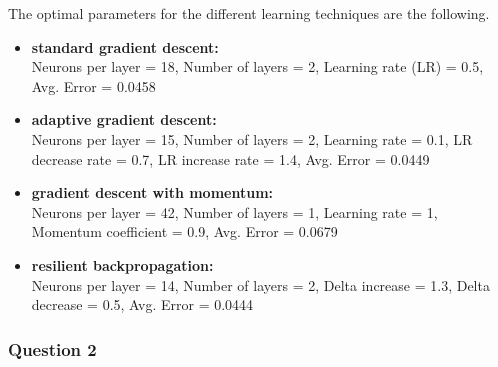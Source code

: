 \documentclass{article}
\begin{document}
The optimal parameters for the different learning techniques are the following.
\begin{itemize}
\item \textbf{standard gradient descent:} \\ Neurons per layer = 18, Number of layers = 2, Learning rate (LR) = 0.5, Avg. Error = 0.0458
\item \textbf{adaptive gradient descent:}\\ Neurons per layer = 15, Number of layers = 2, Learning rate = 0.1, LR decrease rate = 0.7, LR increase rate = 1.4, Avg. Error = 0.0449
\item \textbf{gradient descent with momentum:}\\ Neurons per layer = 42, Number of layers = 1, Learning rate = 1, Momentum coefficient = 0.9, Avg. Error = 0.0679
\item \textbf{resilient backpropagation:}\\ Neurons per layer = 14, Number of layers = 2, Delta increase = 1.3, Delta decrease = 0.5, Avg. Error = 0.0444
\end{itemize}

\subsubsection*{Question 2}
\end{document}
